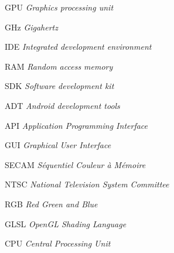 \begin{siglas}
  \item[GPU] \textit{Graphics processing unit}
  \item[GHz] \textit{Gigahertz}
  \item[IDE] \textit{Integrated development environment}
  \item[RAM] \textit{Random access memory}
  \item[SDK] \textit{Software development kit}
  \item[ADT] \textit{Android development tools}
  \item[API] \textit{Application Programming Interface}
  \item[GUI] \textit{Graphical User Interface}
  \item[SECAM] \textit{Séquentiel Couleur à Mémoire}
  \item[NTSC] \textit{National Television System Committee}
  \item[RGB] \textit{Red Green and Blue}
  \item[GLSL] \textit{OpenGL Shading Language}
  \item[CPU] \textit{Central Processing Unit}	


\end{siglas}
